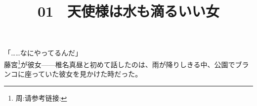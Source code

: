 \documentclass[UTF8,25pt]{ctexart}
\title{01　天使様は水も滴るいい女}
\date{}
\begin{document}
\maketitle
「……なにやってるんだ」\\

藤宮\footnote{周:请参考链接:\cite{https://kanji.jitenon.jp/kanjib/530.html}}が彼女------椎名真昼と初めて話したのは、雨が降りしきる中、公園でブランコに座っていた彼女を見かけた時だった。

\end{document}
